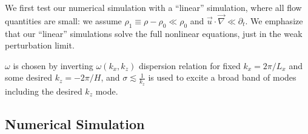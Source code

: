 \documentclass[twocolumn,
        nofootinbib,
        usenames, %
        dvipsnames %
    ]{revtex4-1}%
\begin{document}
We first test our numerical simulation with a ``linear'' simulation, where
all flow quantities are small: we assume  $\rho_1 \equiv \rho - \rho_0 \ll
\rho_0$ and $\vec{u} \cdot \vec{\nabla} \ll \partial_t$. We emphasize that our
``linear'' simulations solve the full nonlinear equations, just in the weak
perturbation limit.

$\omega$ is chosen by inverting $\omega(k_x, k_z)$ dispersion relation for fixed
$k_x = 2\pi / L_x$ and some desired $k_z = -2\pi/H$, and $\sigma \lesssim
\frac{1}{k_z}$ is used to excite a broad band of modes including the desired
$k_z$ mode.

\subsection{Numerical Simulation}\label{ss:lin_ns}
\end{document}
